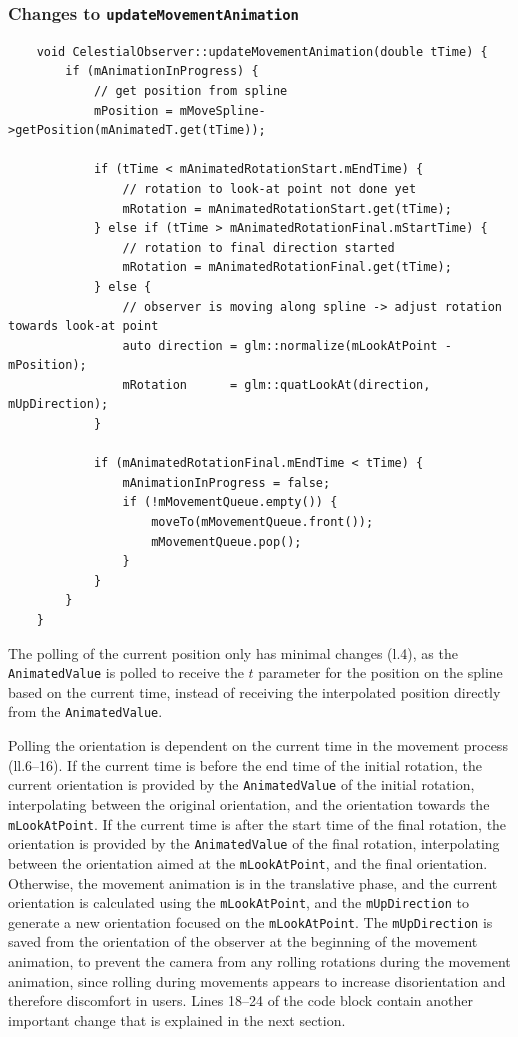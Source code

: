 \subsubsection{Changes to \texttt{updateMovementAnimation}}\label{subsubsec:changes-to-updatemovementanimation}

\begin{verbatim}
    void CelestialObserver::updateMovementAnimation(double tTime) {
        if (mAnimationInProgress) {
            // get position from spline
            mPosition = mMoveSpline->getPosition(mAnimatedT.get(tTime));

            if (tTime < mAnimatedRotationStart.mEndTime) {
                // rotation to look-at point not done yet
                mRotation = mAnimatedRotationStart.get(tTime);
            } else if (tTime > mAnimatedRotationFinal.mStartTime) {
                // rotation to final direction started
                mRotation = mAnimatedRotationFinal.get(tTime);
            } else {
                // observer is moving along spline -> adjust rotation towards look-at point
                auto direction = glm::normalize(mLookAtPoint - mPosition);
                mRotation      = glm::quatLookAt(direction, mUpDirection);
            }

            if (mAnimatedRotationFinal.mEndTime < tTime) {
                mAnimationInProgress = false;
                if (!mMovementQueue.empty()) {
                    moveTo(mMovementQueue.front());
                    mMovementQueue.pop();
                }
            }
        }
    }
\end{verbatim}
The polling of the current position only has minimal changes (l.\@4), as the \texttt{AnimatedValue}
is polled to receive the $t$ parameter for the position on the spline based on the current time, instead of receiving
the interpolated position directly from the \texttt{AnimatedValue}.

Polling the orientation is dependent on the current time in the movement process (ll.\@6--16).
If the current time is before the end time of the initial rotation, the current orientation is provided by the
\texttt{AnimatedValue} of the initial rotation, interpolating between the original orientation, and the
orientation towards the \texttt{mLookAtPoint}.
If the current time is after the start time of the final rotation, the orientation is provided by the
\texttt{AnimatedValue} of the final rotation, interpolating between the orientation aimed at the
\texttt{mLookAtPoint}, and the final orientation.
Otherwise, the movement animation is in the translative phase, and the current orientation is calculated using the 
\texttt{mLookAtPoint}, and the \texttt{mUpDirection} to generate a new orientation focused on the
\texttt{mLookAtPoint}.
The \texttt{mUpDirection} is saved from the orientation of the observer at the beginning of the movement
animation, to prevent the camera from any rolling rotations during the movement animation, since rolling during
movements appears to increase disorientation and therefore discomfort in users.
Lines 18--24 of the code block contain another important change that is explained in the next section.

